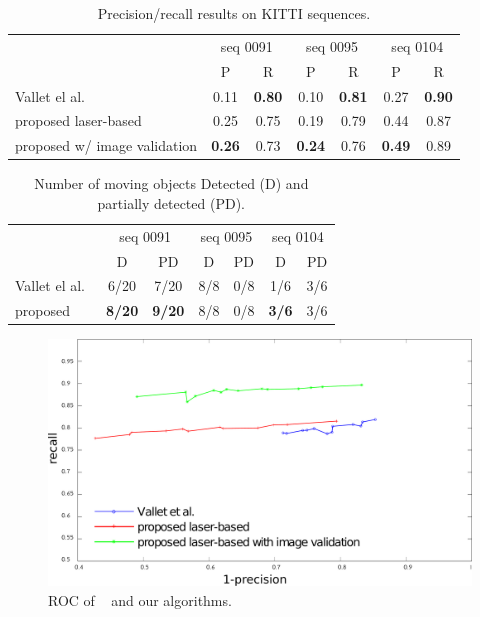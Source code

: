\begin{table}[t]
\caption{Precision/recall results on KITTI sequences.}
\label{tab:resPR}
\centering
\setlength{\tabcolsep}{3px}
\begin{tabular}{lcccccc}
\toprule                                                                                
&\multicolumn{2}{c}{seq 0091}&\multicolumn{2}{c}{seq 0095}&\multicolumn{2}{c}{seq 0104}\\
&P & R &P & R &P & R \\
\midrule
Vallet el al.~\cite{vallet2015extracting}       &       0.11&\textbf{0.80}      &       0.10&\textbf{0.81}      & 0.27&\textbf{0.90}\\
proposed laser-based                            &   0.25&0.75   &  0.19&0.79    & 0.44&0.87\\
proposed w/ image validation                            &       \textbf{0.26}&0.73      &  \textbf{0.24}&0.76   & \textbf{0.49}&0.89\\
\end{tabular}
\end{table}


\begin{table}[t]
\caption{Number of  moving objects Detected (D) and partially detected (PD).}
\label{tab:numPRobj}
\centering
\begin{tabular}{lcccccc}
\toprule 
&\multicolumn{2}{c}{seq 0091}&\multicolumn{2}{c}{seq 0095}&\multicolumn{2}{c}{seq 0104}\\
&D & PD &D & PD &D & PD \\
\midrule
Vallet el al.~\cite{vallet2015extracting}       & 6/20  & 7/20  & 8/8 &   0/8   &    1/6        & 3/6\\
proposed & \textbf{8/20}        & \textbf{9/20} & 8/8 &   0/8   &    \textbf{3/6}       & 3/6 \\
\end{tabular}
\end{table}

\begin{figure}[t]
\centering
\includegraphics[width=0.98\columnwidth]{./img/ch-laser/graphres3}
\caption{ROC of ~\cite{vallet2015extracting} and our algorithms.}
\label{fig:roc}
\end{figure}

